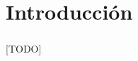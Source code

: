 \documentclass{subfiles}
\begin{document}
  \chapter{Introducción}
  \label{chap:intro}

    \paragraph{}
    [TODO]
\end{document}
